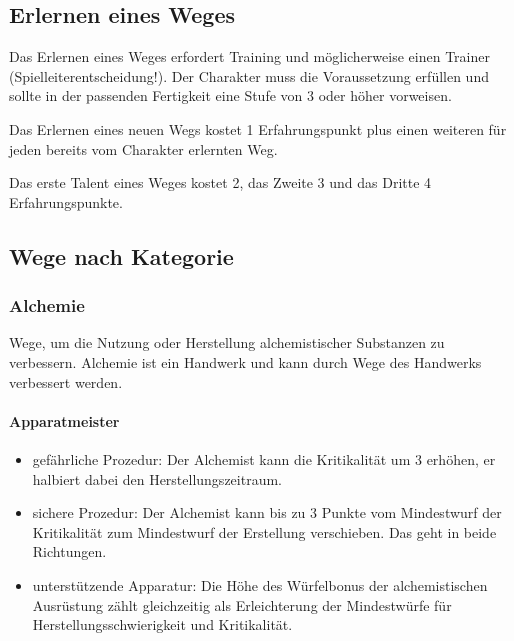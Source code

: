 \documentclass{article}
\begin{document}
\begin{center}
\subsection{Erlernen eines Weges}
\end{center}

Das Erlernen eines Weges erfordert Training und möglicherweise einen Trainer (Spielleiterentscheidung!). Der Charakter
muss die Voraussetzung erfüllen und sollte in der passenden Fertigkeit eine Stufe von 3 oder höher vorweisen.

Das Erlernen eines neuen Wegs kostet 1 Erfahrungspunkt plus einen weiteren für jeden bereits vom Charakter erlernten Weg.

Das erste Talent eines Weges kostet 2, das Zweite 3 und das Dritte 4 Erfahrungspunkte.

\begin{center}
\subsection{Wege nach Kategorie}
\end{center}

\subsubsection{Alchemie}

Wege, um die Nutzung oder Herstellung alchemistischer Substanzen zu verbessern. Alchemie ist ein Handwerk und kann
durch Wege des Handwerks verbessert werden.

\paragraph{Apparatmeister}

\begin{itemize}
\item gefährliche Prozedur: Der Alchemist kann die Kritikalität um 3 erhöhen, er halbiert dabei den Herstellungszeitraum.
\item sichere Prozedur: Der Alchemist kann bis zu 3 Punkte vom Mindestwurf der Kritikalität zum Mindestwurf der Erstellung verschieben. Das geht in beide Richtungen.
\item unterstützende Apparatur: Die Höhe des Würfelbonus der alchemistischen Ausrüstung zählt gleichzeitig als Erleichterung der Mindestwürfe für Herstellungsschwierigkeit und Kritikalität.
\end{itemize}
\end{document}
